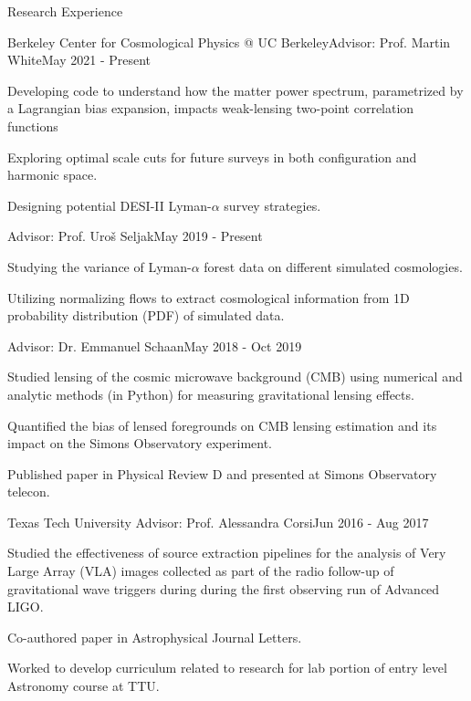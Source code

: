 \documentclass{resume} %
\begin{document}
\begin{rSection}{Research Experience}
\begin{rSubsection}{Berkeley Center for Cosmological Physics @ UC Berkeley}{}{Advisor: Prof. Martin White}{May 2021 - Present}
\item Developing code to understand how the matter power spectrum, parametrized by a Lagrangian bias expansion, impacts weak-lensing two-point correlation functions
\item Exploring optimal scale cuts for future surveys in both configuration and harmonic space.
\item Designing potential DESI-II Lyman-$\alpha$ survey strategies.
\end{rSubsection}
\vspace{-.7cm}
\begin{rSubsection}{}{}{Advisor: Prof. Uro\v{s} Seljak}{May 2019 - Present}
\item Studying the variance of Lyman-$\alpha$ forest data on different simulated cosmologies.
\item Utilizing normalizing flows to extract cosmological information from 1D probability distribution (PDF) of simulated data.
\end{rSubsection}
\vspace{-.7cm}
\begin{rSubsection}{}{}{Advisor: Dr. Emmanuel Schaan}{May 2018 - Oct 2019}
\item Studied lensing of the cosmic microwave background  (CMB) using numerical and analytic methods (in Python) for measuring gravitational lensing effects.
\item Quantified the bias of lensed foregrounds on CMB lensing estimation and its impact on the Simons Observatory experiment.
\item Published paper in Physical Review D and presented at Simons Observatory telecon.
\end{rSubsection}
\begin{rSubsection}{Texas Tech University}{ }{Advisor: Prof. Alessandra Corsi}{Jun 2016 - Aug 2017}
\item Studied the effectiveness of source extraction pipelines for the analysis of Very Large Array (VLA) images collected as part of the radio follow-up of gravitational wave triggers during during the first observing run of Advanced LIGO.
\item Co-authored paper in Astrophysical Journal Letters.
\item Worked to develop curriculum related to research for lab portion of entry level Astronomy course at TTU.
\end{rSubsection}

\end{rSection}
\end{document}
